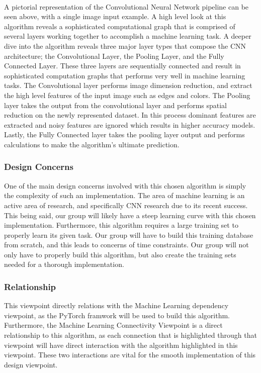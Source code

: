 \documentclass[onecolumn, draftclsnofoot,10pt, compsoc]{IEEEtran}
\begin{document}
\\
 A pictorial representation of the Convolutional Neural Network pipeline can be seen above, with a single image input example. A high level look at this algorithm reveals a sophisticated computational graph that is comprised of several layers working together to accomplish a machine learning task. A deeper dive into the algorithm reveals three major layer types that compose the CNN architecture; the Convolutional Layer, the Pooling Layer, and the Fully Connected Layer. These three layers are sequentially connected and result in sophisticated computation graphs that performs very well in machine learning tasks. The Convolutional layer performs image dimension reduction, and extract the high level features of the input image such as edges and colors. The Pooling layer takes the output from the convolutional layer and performs spatial reduction on the newly represented dataset. In this process dominant features are extracted and noisy features are ignored which results in higher accuracy models. Lastly, the Fully Connected layer takes the pooling layer output and performs calculations to make the algorithm’s ultimate prediction\cite{first}.


\subsubsection{Design Concerns}
One of the main design concerns involved with this chosen algorithm is simply the complexity of such an implementation. The area of machine learning is an active area of research, and specifically CNN research due to its recent success. This being said, our group will likely have a steep learning curve with this chosen implementation. Furthermore, this algorithm requires a large training set to properly learn its given task. Our group will have to build this training database from scratch, and this leads to concerns of time constraints. Our group will not only have to properly build this algorithm, but also create the training sets needed for a thorough implementation.
\subsubsection{Relationship}
This viewpoint directly relations with the Machine Learning dependency viewpoint, as the PyTorch framwork will be used to build this algorithm. Furthermore, the Machine Learning Connectivity Viewpoint is a direct relationship to this algorithm, as each connection that is highlighted through that viewpoint will have direct interaction with the algorithm highlighted in this viewpoint. These two interactions are vital for the smooth implementation of this design viewpoint.
\end{document}
